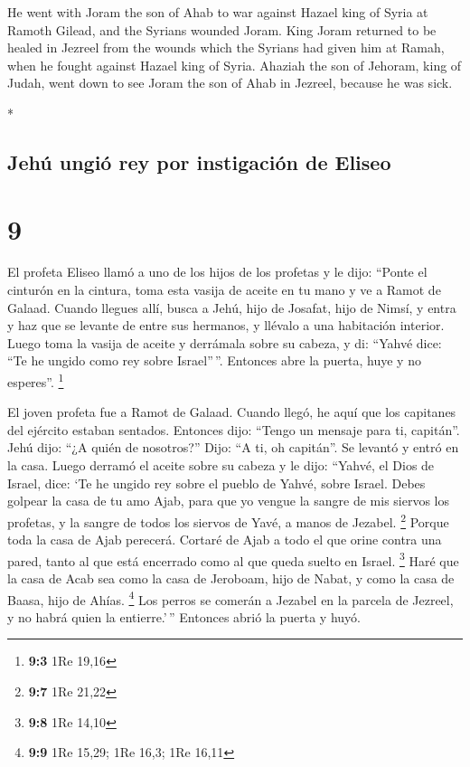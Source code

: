 \begin{paracol}{2}
\begin{otherlanguage}{english}
 He went with Joram the son of Ahab to war against Hazael
king of Syria at Ramoth Gilead, and the Syrians wounded Joram.
 King Joram returned to be healed in Jezreel from the
wounds which the Syrians had given him at Ramah, when he fought against
Hazael king of Syria. Ahaziah the son of Jehoram, king of Judah, went
down to see Joram the son of Ahab in Jezreel, because he was sick.

\end{otherlanguage}

\switchcolumn[0]*

\hypertarget{jehuxfa-ungiuxf3-rey-por-instigaciuxf3n-de-eliseo}{%
\subsection{Jehú ungió rey por instigación de
Eliseo}\label{jehuxfa-ungiuxf3-rey-por-instigaciuxf3n-de-eliseo}}

\hypertarget{section-16}{%
\section{9}\label{section-16}}

 El profeta Eliseo llamó a uno de los hijos de los
profetas y le dijo: ``Ponte el cinturón en la cintura, toma esta vasija
de aceite en tu mano y ve a Ramot de Galaad.  Cuando
llegues allí, busca a Jehú, hijo de Josafat, hijo de Nimsí, y entra y
haz que se levante de entre sus hermanos, y llévalo a una habitación
interior.  Luego toma la vasija de aceite y derrámala
sobre su cabeza, y di: ``Yahvé dice: ``Te he ungido como rey sobre
Israel''\,''. Entonces abre la puerta, huye y no esperes''. \footnote{\textbf{9:3}
  1Re 19,16}

 El joven profeta fue a Ramot de Galaad. 
Cuando llegó, he aquí que los capitanes del ejército estaban sentados.
Entonces dijo: ``Tengo un mensaje para ti, capitán''. Jehú dijo: ``¿A
quién de nosotros?'' Dijo: ``A ti, oh capitán''.  Se
levantó y entró en la casa. Luego derramó el aceite sobre su cabeza y le
dijo: ``Yahvé, el Dios de Israel, dice: `Te he ungido rey sobre el
pueblo de Yahvé, sobre Israel.  Debes golpear la casa de
tu amo Ajab, para que yo vengue la sangre de mis siervos los profetas, y
la sangre de todos los siervos de Yavé, a manos de Jezabel. \footnote{\textbf{9:7}
  1Re 21,22}  Porque toda la casa de Ajab perecerá.
Cortaré de Ajab a todo el que orine contra una pared, tanto al que está
encerrado como al que queda suelto en Israel. \footnote{\textbf{9:8} 1Re
  14,10}  Haré que la casa de Acab sea como la casa de
Jeroboam, hijo de Nabat, y como la casa de Baasa, hijo de Ahías.
\footnote{\textbf{9:9} 1Re 15,29; 1Re 16,3; 1Re 16,11} 
Los perros se comerán a Jezabel en la parcela de Jezreel, y no habrá
quien la entierre.'\,'' Entonces abrió la puerta y huyó.


\end{paracol}
